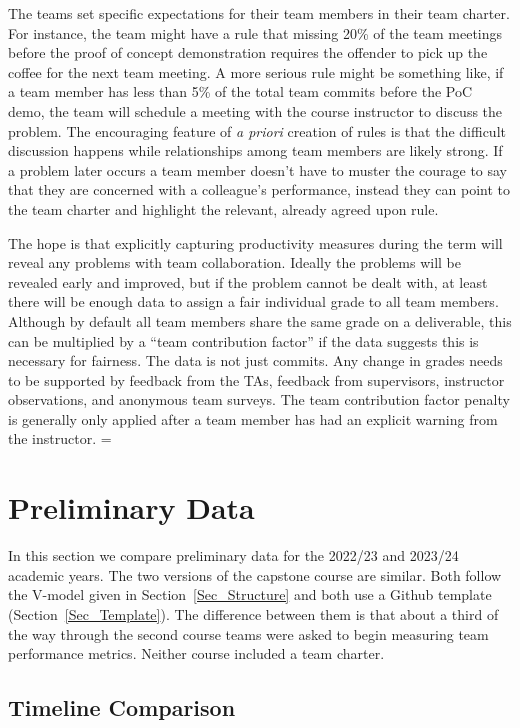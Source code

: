 \documentclass[10pt, conference]{IEEEtran}
\begin{document}
The teams set specific expectations for their team members in their team
charter. For instance, the team might have a rule that missing 20\% of the team
meetings before the proof of concept demonstration requires the offender to pick
up the coffee for the next team meeting. A more serious rule might be something
like, if a team member has less than 5\% of the total team commits before the
PoC demo, the team will schedule a meeting with the course instructor to discuss
the problem. The encouraging feature of \emph{a priori} creation of rules is
that the difficult discussion happens while relationships among team members are
likely strong.  If a problem later occurs a team member doesn't have to muster
the courage to say that they are concerned with a colleague's performance,
instead they can point to the team charter and highlight the relevant, already
agreed upon rule.

The hope is that explicitly capturing productivity measures during the term will
reveal any problems with team collaboration.  Ideally the problems will be
revealed early and improved, but if the problem cannot be dealt with, at least
there will be enough data to assign a fair individual grade to all team members.
Although by default all team members share the same grade on a deliverable, this
can be multiplied by a ``team contribution factor'' if the data suggests this is
necessary for fairness.  The data is not just commits.  Any change in grades
needs to be supported by feedback from the TAs, feedback from supervisors,
instructor observations, and anonymous team surveys.  The team contribution
factor penalty is generally only applied after a team member has had an explicit
warning from the instructor.
=
\section{Preliminary Data} \label{SecPrelimData}

In this section we compare preliminary data for the 2022/23 and 2023/24 academic
years.  The two versions of the capstone course are similar.  Both follow the
V-model given in Section~\ref{Sec_Structure} and both use a Github template
(Section~\ref{Sec_Template}). The difference between them is that about a third
of the
way through the second course teams were asked to begin measuring team
performance metrics.  Neither course included a team charter.

\subsection{Timeline Comparison}
\end{document}
